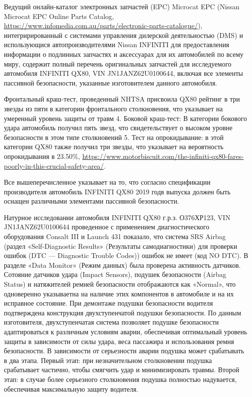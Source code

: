 Ведущий онлайн-каталог электронных запчастей (EPC) Microcat EPC (Nissan Microcat EPC Online Parts Catalog, \url{https://www.infomedia.com.au/parts/electronic-parts-catalogue/}), интегрирированный с системами управления дилерской деятельностью (DMS) и использующися автопроизводителями  Nissan INFINITI для предоставления информации о подлинных запчастях и аксессуарах для их автомобилей по всему миру, содержит  полный перечень оригинальных запчастей для  исследуемого автомобиля INFINITI QX80, VIN JN1JANZ62U0100644, включая все элементы пассивной безопасности, указанные изготовителем данного автомобиля.

Фронтальный краш-тест, проведенный  NHTSA присвоила QX80 рейтинг в три звезды из пяти в категории фронтального столкновения, что указывает на умеренный уровень защиты от травм 4. Боковой краш-тест: В категории бокового удара автомобиль получил пять звезд, что свидетельствует о высоком уровне безопасности в этом типе столкновений 5. Тест на опрокидывание: в этой категории QX80 также получил три звезды, что указывает на вероятность опрокидывания в 23.50\%, \url{https://www.motorbiscuit.com/the-infiniti-qx80-fares-poorly-in-this-crucial-safety-area/}.

Все вышеперечисленное указывает на то, что согласно спецификации производителя автомобиль INFINITI QX80 2019 годв выпуска должен быть оснащен различными элементами пассивной безопасности.

Натурное исследовании автомобиля INFINITI QX80 г.р.з. О376ХР123, VIN JN1JANZ62U0100644 проведенное  с применением  диагностического оборудования  Consalt III и Launch 431  показало, что система SRS Airbag  
 (раздел «Self-Diagnostic Results» (Результаты самодиагностики) для проверки ошибок (DTC — Diagnostic Trouble Codes)) ошибок не имеет (код NO DTC).   В разделе «Data Monitor» (Режим данных) была проверена активность датчиков. Сотояние датчиков удара (Impact Sensors),  подушек безопасности (Airbag Status) и натяжителей ремней безопасности  отображаются как «Normal»,  что одноверенно указываетна на наличие этих компонентов в автомобиле и на их исправное состояние. При демонтаже подушки безопасности водителя подтверждена конструкция двухступенчатой подушки безопасности. По данным изготовителя, двухступенчатая система позволяет подушке безопасности адаптироваться к различным условиям аварии, обеспечивая оптимальный уровень защиты в зависимости от силы удара, веса пассажира и использования ремня безопасности. В зависимости от серьезности аварии подушка может срабатывать в два этапа.  Первый этап: при незначительном столкновении подушка срабатывает частично, чтобы смягчить удар и минимизировать травмы.  Второй этап: в случае более серьезного столкновения подушка полностью надувается, обеспечивая максимальную защиту водителя. 
 
